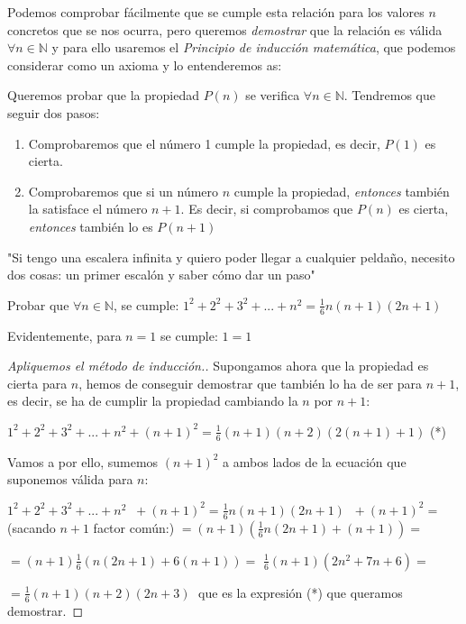 		Podemos comprobar fácilmente que se cumple esta relación para los valores $n$ concretos que se nos ocurra, pero queremos \emph{demostrar} que la relación es válida $\forall n\in \mathbb N$ y para ello usaremos el \emph{Principio de inducción matemática}, que podemos considerar como un axioma y lo entenderemos as:
		
		\begin{axio} Queremos probar que la propiedad $P(n)$ se verifica $\forall n\in \mathbb N$. Tendremos que seguir dos pasos:
			\begin{enumerate}
				\item Comprobaremos que el número 1 cumple la propiedad, es decir, $P(1)$ es cierta.
				\item Comprobaremos que si un número $n$ cumple la propiedad, \emph{entonces} también la satisface el número $n+1$. Es decir, si comprobamos que $P(n)$ es cierta, \emph{entonces} también lo es $P(n+1)$
			\end{enumerate}
			
			"Si tengo una escalera infinita y quiero poder llegar a cualquier peldaño, necesito dos cosas: un primer escalón y saber cómo dar un paso"
		\end{axio}

		
		\begin{ejem} \label{sum-cuad-induc}
		Probar que $\forall n\in \mathbb N$, se cumple:
		$1^2+2^2+3^2+...+n^2=\frac 1 6 n (n+1)(2n+1)$	
		\end{ejem}
		 Evidentemente, para $n=1$ se cumple: $1=1$
		
		\begin{proof}[Apliquemos el método de inducción.]
			
		Supongamos ahora que la propiedad es cierta para $n$, hemos de conseguir demostrar que también lo ha de ser para $n+1$, es decir, se ha de cumplir la propiedad cambiando la $n$ por $n+1$:
		
		$1^2+2^2+3^2+...+n^2+(n+1)^2=\frac 1 6 (n+1) (n+2)(2(n+1)+1)$ (*)
		
		Vamos a por ello, sumemos $(n+1)^2$ a ambos lados de la ecuación que suponemos válida para $n$:
		
		
		$1^2+2^2+3^2+...+n^2\; \; +(n+1)^2=\frac 1 6 n (n+1)(2n+1)\; \; +(n+1)^2=$
		(sacando $n+1$ factor común:)
		$=(n+1) \left( \frac 1 6 n (2n+1) +(n+1) \right)=$
		
		$=(n+1)\frac 1 6 \left(  n (2n+1) + 6(n+1) \right)=$
		$\frac 1 6 (n+1) (2n^2+7n+6)=$
		
		$=\frac 1 6 (n+1) (n+2) (2n+3)\; $ que es la expresión (*) que queramos demostrar.%
		\end{proof}
		
